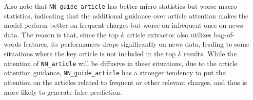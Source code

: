 Also note that \texttt{NN\_guide\_article} has better micro statistics but worse macro statistics, indicating that the additional guidance over article attention makes the model perform better on frequent charges but worse on infrequent ones on news data. 
The reason is that, since the top $k$ article extractor also utilizes bag-of-words features, its performances drops significantly on news data, leading to some situations where the key article is not included in the top $k$ results. While the attention of \texttt{NN\_article} will be diffusive in these situations, due to the article attention guidance, \texttt{NN\_guide\_article} has a stronger tendency to put the attention on the articles related to frequent or other relevant charges, and thus is more likely to generate false prediction.  

